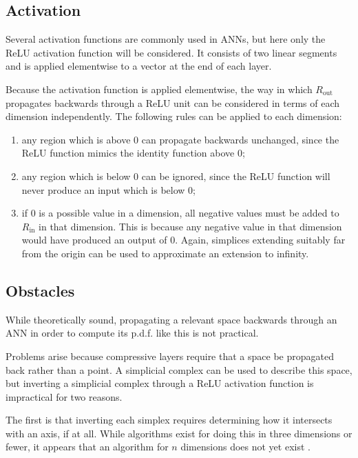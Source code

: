 \documentclass[../../main.tex]{subfiles}
\begin{document}
\subsection{Activation} \label{subsection:activation}

Several activation functions are commonly used in ANNs, but here only the ReLU activation function \cite{agarap19} will be considered.
It consists of two linear segments and is applied elementwise to a vector at the end of each layer.

Because the activation function is applied elementwise, the way in which $R_\text{out}$ propagates backwards through a ReLU unit can be considered in terms of each dimension independently.
The following rules can be applied to each dimension:
\begin{enumerate}
    \item any region which is above $0$ can propagate backwards unchanged, since the ReLU function mimics the identity function above $0$;
    \item any region which is below $0$ can be ignored, since the ReLU function will never produce an input which is below $0$;
    \item if $0$ is a possible value in a dimension, all negative values must be added to $R_\text{in}$ in that dimension.
    This is because any negative value in that dimension would have produced an output of $0$.
    Again, simplices extending suitably far from the origin can be used to approximate an extension to infinity.
\end{enumerate}

\subsection{Obstacles} \label{subsection:obstacles}

While theoretically sound, propagating a relevant space backwards through an ANN in order to compute its p.d.f. like this is not practical.

Problems arise because compressive layers require that a space be propagated back rather than a point.
A simplicial complex can be used to describe this space, but inverting a simplicial complex through a ReLU activation function is impractical for two reasons.

The first is that inverting each simplex requires determining how it intersects with an axis, if at all.
While algorithms exist for doing this in three dimensions or fewer, it appears that an algorithm for $n$ dimensions does not yet exist \cite{wildberger12}.
\end{document}
